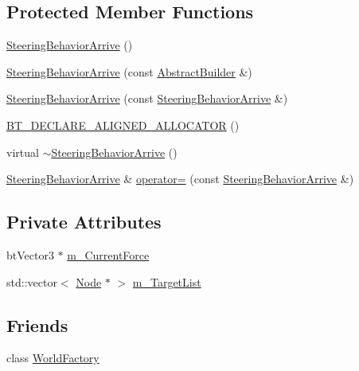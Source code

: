 \subsection*{Protected Member Functions}
\begin{DoxyCompactItemize}
\item 
\mbox{\hyperlink{classnjli_1_1_steering_behavior_arrive_ac9499db709a2309b89510387dd152b94}{Steering\+Behavior\+Arrive}} ()
\item 
\mbox{\hyperlink{classnjli_1_1_steering_behavior_arrive_ae328206069abff74224522ddfa56cd4d}{Steering\+Behavior\+Arrive}} (const \mbox{\hyperlink{classnjli_1_1_abstract_builder}{Abstract\+Builder}} \&)
\item 
\mbox{\hyperlink{classnjli_1_1_steering_behavior_arrive_a85bc716d1f6300796e3d4f7b8eed4563}{Steering\+Behavior\+Arrive}} (const \mbox{\hyperlink{classnjli_1_1_steering_behavior_arrive}{Steering\+Behavior\+Arrive}} \&)
\item 
\mbox{\hyperlink{classnjli_1_1_steering_behavior_arrive_a58060a9c8544488d65280d03bfc81ea1}{B\+T\+\_\+\+D\+E\+C\+L\+A\+R\+E\+\_\+\+A\+L\+I\+G\+N\+E\+D\+\_\+\+A\+L\+L\+O\+C\+A\+T\+OR}} ()
\item 
virtual \mbox{\hyperlink{classnjli_1_1_steering_behavior_arrive_a99591af7c7b81ea8fa9881572357e4df}{$\sim$\+Steering\+Behavior\+Arrive}} ()
\item 
\mbox{\hyperlink{classnjli_1_1_steering_behavior_arrive}{Steering\+Behavior\+Arrive}} \& \mbox{\hyperlink{classnjli_1_1_steering_behavior_arrive_ad543d29289854fae252bdac1445fc141}{operator=}} (const \mbox{\hyperlink{classnjli_1_1_steering_behavior_arrive}{Steering\+Behavior\+Arrive}} \&)
\end{DoxyCompactItemize}
\subsection*{Private Attributes}
\begin{DoxyCompactItemize}
\item 
bt\+Vector3 $\ast$ \mbox{\hyperlink{classnjli_1_1_steering_behavior_arrive_a008d4326c190d7d9dec813de4a0aa71b}{m\+\_\+\+Current\+Force}}
\item 
std\+::vector$<$ \mbox{\hyperlink{classnjli_1_1_node}{Node}} $\ast$ $>$ \mbox{\hyperlink{classnjli_1_1_steering_behavior_arrive_a0e8b5e159c8ad606a7fae7e2ad67b1af}{m\+\_\+\+Target\+List}}
\end{DoxyCompactItemize}
\subsection*{Friends}
\begin{DoxyCompactItemize}
\item 
class \mbox{\hyperlink{classnjli_1_1_steering_behavior_arrive_acb96ebb09abe8f2a37a915a842babfac}{World\+Factory}}
\end{DoxyCompactItemize}

